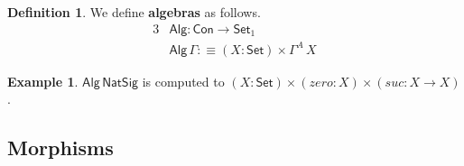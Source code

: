 \documentclass[12pt,a4paper,twoside,openany]{book}
\theoremstyle{remark}
\theoremstyle{definition}
\newtheorem{mydefinition}{Definition}
\newtheorem{myexample}{Example}
\newcommand{\mi}[1]{\mathit{#1}}
\newcommand{\ms}[1]{\mathsf{#1}}
\newcommand{\Con}{\mathsf{Con}}
\newcommand{\Set}{\mathsf{Set}}
\newcommand{\Alg}{\ms{Alg}}
\newcommand{\defn}{:\equiv}
\begin{document}
\begin{mydefinition} We define \textbf{algebras} as follows.
\begin{alignat*}{3}
  & \Alg : \Con \to \Set_1 \\
  & \Alg\,\Gamma \defn (X : \Set) \times \Gamma^A\,X
\end{alignat*}
\end{mydefinition}

\begin{myexample} $\Alg\,\ms{NatSig}$ is computed to $(X : \Set)\times(\mi{zero} :
X)\times(\mi{suc} : X \to X)$.
\end{myexample}

\subsection{Morphisms}
\end{document}
